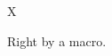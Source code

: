 \documentclass{article}
\begin{document}
\begin{figure}X\caption{Right by a macro.}\end{figure}
\end{document}
